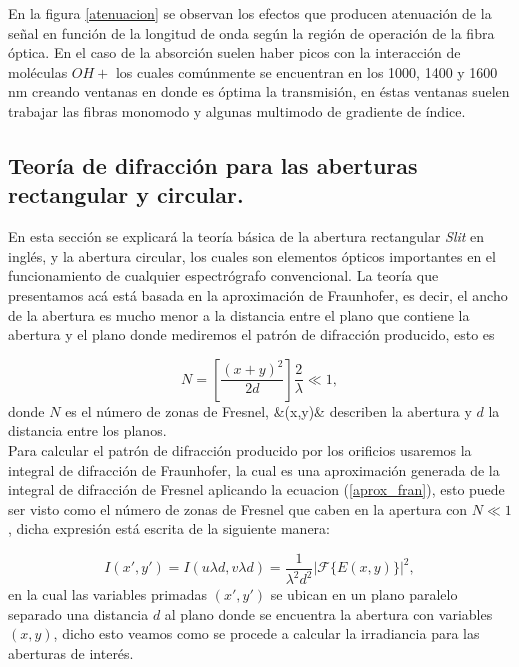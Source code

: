 En la figura \ref{atenuacion} se observan los efectos que producen atenuación de la señal en función de la longitud de onda según la región de operación de la fibra óptica. En el caso de la absorción suelen haber picos con la interacción de moléculas $OH+$ los cuales comúnmente se encuentran en los 1000, 1400 y 1600 nm creando ventanas en donde es óptima la transmisión, en éstas ventanas suelen trabajar las fibras monomodo y algunas multimodo de gradiente de índice.


\subsection{Teoría de difracción para las aberturas rectangular y circular.}

En esta sección se explicará la teoría básica de la abertura rectangular \textit{Slit} en inglés, y la abertura circular, los cuales son elementos ópticos importantes en el funcionamiento de cualquier espectrógrafo convencional. La teoría que presentamos acá está basada en la aproximación de Fraunhofer, es decir, el ancho de la abertura es mucho menor a la distancia entre el plano que contiene la abertura y el plano donde mediremos el patrón de difracción producido, esto es

\begin{equation}\label{aprox_fran}
    N=\left[ \frac{{(x+y)}^2}{2d}\right]\frac{2}{\lambda}\ll 1,
\end{equation}
donde $N$ es el número de zonas de Fresnel, &(x,y)& describen la abertura y $d$ la distancia entre los planos.\\

Para calcular el patrón de difracción producido por los orificios usaremos la integral de difracción de Fraunhofer, la cual es una aproximación generada de la integral de difracción de Fresnel aplicando la ecuacion (\ref{aprox_fran}), esto puede ser visto como el número de zonas de Fresnel que caben en la apertura con $N\ll 1$, dicha expresión está escrita de la siguiente manera:

\begin{equation}\label{difraccion_fraunhofer}
    I(x',y')=I(u\lambda d,v\lambda d)=\frac{1}{\lambda^2 d^2}|\mathcal{F}\lbrace E(x,y) \rbrace |^2 ,
\end{equation}
en la cual las variables primadas $(x',y')$ se ubican en un plano paralelo separado una distancia $d$ al plano donde se encuentra la abertura con variables $(x,y)$, dicho esto veamos como se procede a calcular la irradiancia para las aberturas de interés.

